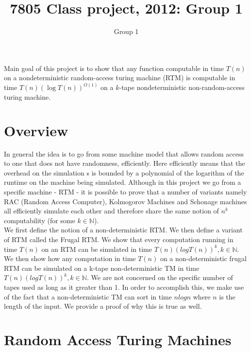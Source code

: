 \documentclass[english]{article}
\theoremstyle{plain}
\theoremstyle{definition}
\theoremstyle{plain}
\begin{document}
\title{7805 Class project, 2012: Group 1}
\author{Group 1}
\maketitle

Main goal of this project is to show that any function computable in
time $T(n)$ on a nondeterministic random-access turing machine (RTM)
is computable in time $T(n)(\log T(n))^{O(1)}$ on a $k$-tape
nondeterministic non-random-access turing machine.

\section{Overview}

In general the idea is to go from some machine model that allows
random access to one that does not have randomness, efficiently. Here
efficiently means that the overhead on the simulation s is bounded by
a polynomial of the logarithm of the runtime on the machine being
simulated. Although in this project we go from a specific machine -
RTM - it is possible to prove that a number of variants namely RAC
(Random Access Computer), Kolmogorov Machines and Schonage machines
all efficiently simulate each other and therefore share the same
notion of $n^k$ computability (for some $k \in \mathbb{N}$). \\

We first define the notion of a non-deterministic RTM. We then define
a variant of RTM called the Frugal RTM. We show that every computation
running in time $T(n)$ on an RTM can be simulated in time $T(n) (log
T(n))^k, k \in \mathbb{N}$. We then show how any computation in time
$T(n)$ on a non-deterministic frugal RTM can be simulated on a k-tape
non-deterministic TM in time $T(n) (log T(n))^k, k \in \mathbb{N}$. We
are not concerned on the specific number of tapes used as long as it
greater than 1. In order to accomplish this, we make use of the fact
that a non-deterministic TM can sort in time $n logn$ where $n$ is the
length of the input. We provide a proof of why this is true as well.

\section{Random Access Turing Machines}	
\end{document}
